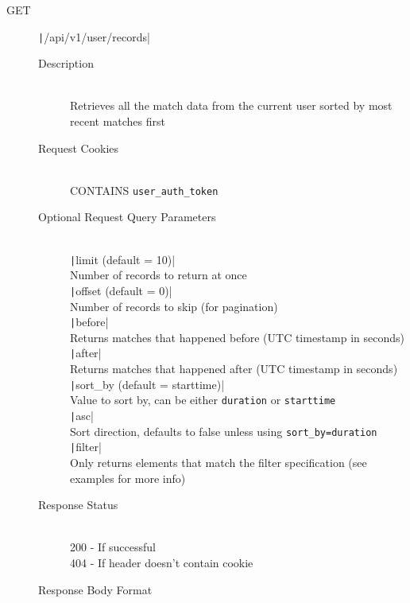 \documentclass{article}
\begin{document}
\begin{description}
  \item[GET] \texttt|/api/v1/user/records|
  \begin{description}
    \item[Description] \hfill \\
    Retrieves all the match data from the current user sorted by most recent matches first
    \item[Request Cookies] \hfill \\
    CONTAINS \texttt{user_auth_token}
    \item[Optional Request Query Parameters] \hfill \\
    \texttt|limit (default = 10)| \\
    Number of records to return at once \vspace{0.5em} \\
    \texttt|offset (default = 0)| \\
    Number of records to skip (for pagination) \vspace{0.5em} \\
    \texttt|before| \\
    Returns matches that happened before (UTC timestamp in seconds) \vspace{0.5em} \\
    \texttt|after| \\
    Returns matches that happened after (UTC timestamp in seconds) \vspace{0.5em} \\
    \texttt|sort_by (default = starttime)| \\
    Value to sort by, can be either \texttt{duration} or \texttt{starttime} \vspace{0.5em} \\
    \texttt|asc| \\
    Sort direction, defaults to false unless using \texttt{sort_by=duration} \vspace{0.5em} \\
    \texttt|filter| \\
    Only returns elements that match the filter specification (see examples for more info)
    \item[Response Status] \hfill \\
    200 - If successful \\
    404 - If header doesn't contain cookie %
    \item[Response Body Format] \hfill \\

\end{description}
\end{description}
\end{document}
